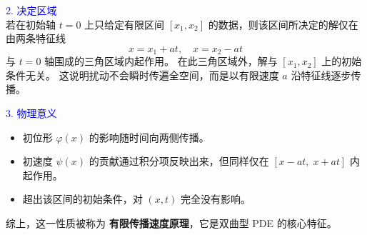 \textcolor{blue}{2. 决定区域}\\
若在初始轴 $t=0$ 上只给定有限区间 $[x_1,x_2]$ 的数据，则该区间所决定的解仅在由两条特征线
\[
x = x_1 + at, 
\quad 
x = x_2 - at
\]
与 $t=0$ 轴围成的三角区域内起作用。  
在此三角区域外，解与 $[x_1,x_2]$ 上的初始条件无关。  
这说明扰动不会瞬时传遍全空间，而是以有限速度 $a$ 沿特征线逐步传播。

\textcolor{blue}{3. 物理意义} 
\begin{itemize}
  \item 初位形 $\varphi(x)$ 的影响随时间向两侧传播。
  \item 初速度 $\psi(x)$ 的贡献通过积分项反映出来，但同样仅在 $[x-at,\;x+at]$ 内起作用。
  \item 超出该区间的初始条件，对 $(x,t)$ 完全没有影响。
\end{itemize}

综上，这一性质被称为 \textbf{有限传播速度原理}，它是双曲型 PDE 的核心特征。

